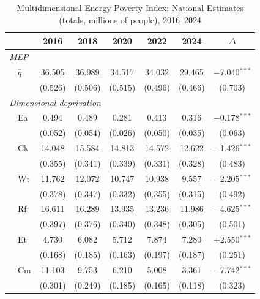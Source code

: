 \documentclass[11pt, a4paper]{article}
\begin{document}
\begin{table}[htb]
\centering
\caption{Multidimensional Energy Poverty Index: National Estimates (totals, millions of people), 2016--2024}
\small
\begin{tabularx}{\textwidth}{l X cccccc}
\toprule
\toprule
 & & 2016 & 2018 & 2020 & 2022 & 2024 & $\Delta$ \\ \midrule
\multicolumn{7}{l}{\textit{MEP}} \\[2pt]
& $\hat{q}$ & 36.505 & 36.989 & 34.517 & 34.032 & 29.465 & $-$7.040$^{***}$ \\
& & {\footnotesize (0.526)} & {\footnotesize (0.506)} & {\footnotesize (0.515)} & {\footnotesize (0.496)} & {\footnotesize (0.466)} & {\footnotesize (0.703)} \\[4pt]
\multicolumn{7}{l}{\textit{Dimensional deprivation}} \\[2pt]
& Ea & 0.494 & 0.489 & 0.281 & 0.413 & 0.316 & $-$0.178$^{***}$ \\
& & {\footnotesize (0.052)} & {\footnotesize (0.054)} & {\footnotesize (0.026)} & {\footnotesize (0.050)} & {\footnotesize (0.035)} & {\footnotesize (0.063)} \\[2pt]
& Ck & 14.048 & 15.584 & 14.813 & 14.572 & 12.622 & $-$1.426$^{***}$ \\
& & {\footnotesize (0.355)} & {\footnotesize (0.341)} & {\footnotesize (0.339)} & {\footnotesize (0.331)} & {\footnotesize (0.328)} & {\footnotesize (0.483)} \\[2pt]
& Wt & 11.762 & 12.072 & 10.747 & 10.938 & 9.557 & $-$2.205$^{***}$ \\
& & {\footnotesize (0.378)} & {\footnotesize (0.347)} & {\footnotesize (0.332)} & {\footnotesize (0.355)} & {\footnotesize (0.315)} & {\footnotesize (0.492)} \\[2pt]
& Rf & 16.611 & 16.289 & 13.935 & 13.236 & 11.986 & $-$4.625$^{***}$ \\
& & {\footnotesize (0.397)} & {\footnotesize (0.376)} & {\footnotesize (0.340)} & {\footnotesize (0.348)} & {\footnotesize (0.305)} & {\footnotesize (0.501)} \\[2pt]
& Et & 4.730 & 6.082 & 5.712 & 7.874 & 7.280 & $+$2.550$^{***}$ \\
& & {\footnotesize (0.168)} & {\footnotesize (0.185)} & {\footnotesize (0.163)} & {\footnotesize (0.197)} & {\footnotesize (0.187)} & {\footnotesize (0.251)} \\[2pt]
& Cm & 11.103 & 9.753 & 6.210 & 5.008 & 3.361 & $-$7.742$^{***}$ \\
& & {\footnotesize (0.301)} & {\footnotesize (0.249)} & {\footnotesize (0.185)} & {\footnotesize (0.165)} & {\footnotesize (0.118)} & {\footnotesize (0.323)} \\[2pt]

\end{tabularx}
\end{table}
\end{document}

